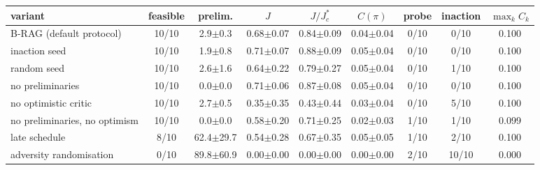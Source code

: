 \begin{tabular}{lcccccccc}
\toprule
variant & feasible & prelim. & $J$ & $J/J^*_c$ & $C(\pi)$ & probe & inaction & $\max_k C_k$ \\
\midrule
B-RAG (default protocol) & 10/10 & 2.9$\pm$0.3 & 0.68$\pm$0.07 & 0.84$\pm$0.09 & 0.04$\pm$0.04 & 0/10 & 0/10 & 0.100 \\
inaction seed & 10/10 & 1.9$\pm$0.8 & 0.71$\pm$0.07 & 0.88$\pm$0.09 & 0.05$\pm$0.04 & 0/10 & 0/10 & 0.100 \\
random seed & 10/10 & 2.6$\pm$1.6 & 0.64$\pm$0.22 & 0.79$\pm$0.27 & 0.05$\pm$0.04 & 0/10 & 1/10 & 0.100 \\
no preliminaries & 10/10 & 0.0$\pm$0.0 & 0.71$\pm$0.06 & 0.87$\pm$0.08 & 0.05$\pm$0.04 & 0/10 & 0/10 & 0.100 \\
no optimistic critic & 10/10 & 2.7$\pm$0.5 & 0.35$\pm$0.35 & 0.43$\pm$0.44 & 0.03$\pm$0.04 & 0/10 & 5/10 & 0.100 \\
no preliminaries, no optimism & 10/10 & 0.0$\pm$0.0 & 0.58$\pm$0.20 & 0.71$\pm$0.25 & 0.02$\pm$0.03 & 1/10 & 1/10 & 0.099 \\
late schedule & 8/10 & 62.4$\pm$29.7 & 0.54$\pm$0.28 & 0.67$\pm$0.35 & 0.05$\pm$0.05 & 1/10 & 2/10 & 0.100 \\
adversity randomisation & 0/10 & 89.8$\pm$60.9 & 0.00$\pm$0.00 & 0.00$\pm$0.00 & 0.00$\pm$0.00 & 2/10 & 10/10 & 0.000 \\
\bottomrule
\end{tabular}
